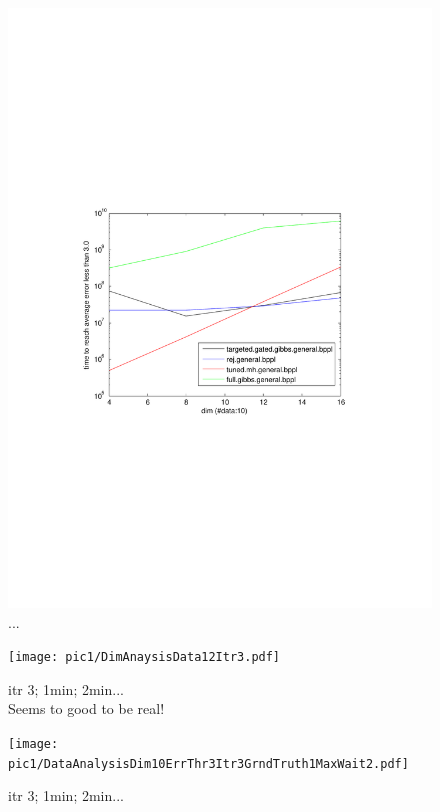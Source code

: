 \begin{figure}%
\centering
\includegraphics[width=1.2\textwidth]{pic1/dimAnalysisData10.pdf}
\caption{...}
\label{fig:pref}
\end{figure}

\begin{figure}%
\centering
\texttt{[image: pic1/DimAnaysisData12Itr3.pdf]}
\caption{itr 3; 1min; 2min...\\Seems to good to be real!}
\label{fig:pref}
\end{figure}


\begin{figure}%
\centering
\texttt{[image: pic1/DataAnalysisDim10ErrThr3Itr3GrndTruth1MaxWait2.pdf]}
\caption{itr 3; 1min; 2min...}
\label{fig:pref}
\end{figure}

